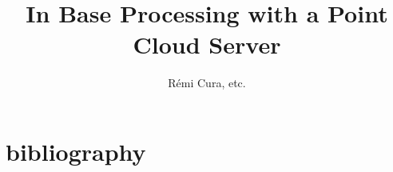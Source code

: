 
	

\title{In Base Processing with a Point Cloud Server}
\author{R\'emi Cura, etc.}



\maketitle
\tableofcontents
\newpage


	
	\newpage

	
	\newpage

	
	\newpage
	
	
	\newpage

	
	\newpage
 
	
	\newpage



	\section{bibliography}
	
%


	\begin{proofreading}
	
		

	 	\newpage
	 	
		\newpage
		\todototoc
		\listoftodos
		
	\end{proofreading}





